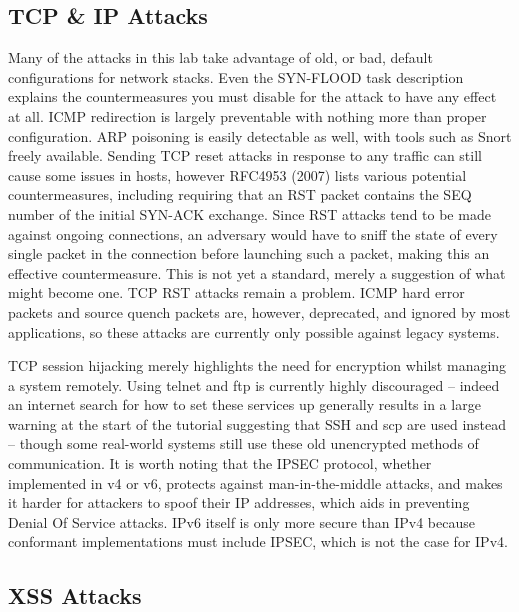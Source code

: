 \subsection{TCP \& IP Attacks}

Many of the attacks in this lab take advantage of old, or bad, default configurations for network stacks. Even the
SYN-FLOOD task description explains the countermeasures you must disable for the attack to have any effect at all. ICMP
redirection is largely preventable with nothing more than proper configuration\cite{sysctl}.
ARP poisoning is easily detectable as well, with tools such as Snort freely available\cite{snort}\cite{snort_arp}.
Sending TCP reset attacks in response to any traffic can still cause some issues in hosts, however RFC4953 (2007) lists
various potential countermeasures, including requiring that an RST packet contains the SEQ number of the initial SYN-ACK
exchange. Since RST attacks tend to be made against ongoing connections, an adversary would have to sniff the state of
every single packet in the connection before launching such a packet, making this an effective countermeasure. This is
not yet a standard, merely a suggestion of what might become one. TCP RST attacks remain a problem. ICMP hard error
packets and source quench packets are, however, deprecated, and ignored by most applications, so these attacks are
currently only possible against legacy systems.

TCP session hijacking merely highlights the need for encryption whilst managing a system remotely. Using telnet and ftp
is currently highly discouraged -- indeed an internet search for how to set these services up generally results in a
large warning at the start of the tutorial suggesting that SSH and scp are used instead -- though some real-world
systems still use these old unencrypted methods of communication. It is worth noting that the IPSEC protocol, whether
implemented in v4 or v6, protects against man-in-the-middle attacks, and makes it harder for attackers to spoof their
IP addresses, which aids in preventing Denial Of Service attacks.\cite{rfc2401}
IPv6 itself is only more secure than IPv4 because conformant implementations must include IPSEC, which
is not the case for IPv4.

\subsection{XSS Attacks}

